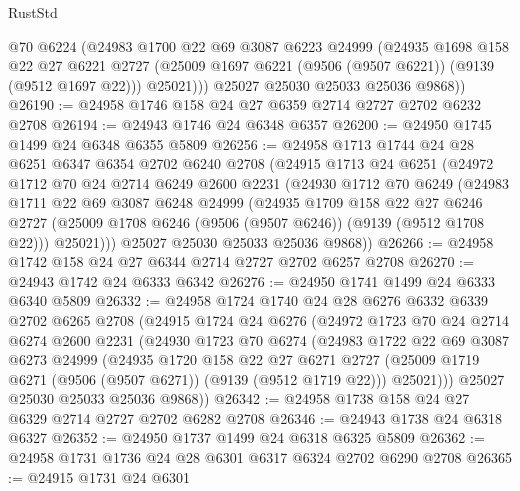 \begin{lexlean}{RustStd}
\begin{coremodule}
          @70
          @6224
          (@24983
            @1700
            @22
            @69
            @3087
            @6223
            @24999
            (@24935
              @1698
              @158
              @22
              @27
              @6221
              @2727
              (@25009 @1697 @6221 (@9506 (@9507 @6221)) (@9139 (@9512 @1697 @22)))
              @25021)))
        @25027
        @25030
        @25033
        @25036
        @9868))
@26190 := @24958 @1746 @158 @24 @27 @6359 @2714 @2727 @2702 @6232 @2708
@26194 := @24943 @1746 @24 @6348 @6357
@26200 := @24950 @1745 @1499 @24 @6348 @6355 @5809
@26256 := @24958
    @1713
    @1744
    @24
    @28
    @6251
    @6347
    @6354
    @2702
    @6240
    @2708
    (@24915
      @1713
      @24
      @6251
      (@24972
        @1712
        @70
        @24
        @2714
        @6249
        @2600
        @2231
        (@24930
          @1712
          @70
          @6249
          (@24983
            @1711
            @22
            @69
            @3087
            @6248
            @24999
            (@24935
              @1709
              @158
              @22
              @27
              @6246
              @2727
              (@25009 @1708 @6246 (@9506 (@9507 @6246)) (@9139 (@9512 @1708 @22)))
              @25021)))
        @25027
        @25030
        @25033
        @25036
        @9868))
@26266 := @24958 @1742 @158 @24 @27 @6344 @2714 @2727 @2702 @6257 @2708
@26270 := @24943 @1742 @24 @6333 @6342
@26276 := @24950 @1741 @1499 @24 @6333 @6340 @5809
@26332 := @24958
    @1724
    @1740
    @24
    @28
    @6276
    @6332
    @6339
    @2702
    @6265
    @2708
    (@24915
      @1724
      @24
      @6276
      (@24972
        @1723
        @70
        @24
        @2714
        @6274
        @2600
        @2231
        (@24930
          @1723
          @70
          @6274
          (@24983
            @1722
            @22
            @69
            @3087
            @6273
            @24999
            (@24935
              @1720
              @158
              @22
              @27
              @6271
              @2727
              (@25009 @1719 @6271 (@9506 (@9507 @6271)) (@9139 (@9512 @1719 @22)))
              @25021)))
        @25027
        @25030
        @25033
        @25036
        @9868))
@26342 := @24958 @1738 @158 @24 @27 @6329 @2714 @2727 @2702 @6282 @2708
@26346 := @24943 @1738 @24 @6318 @6327
@26352 := @24950 @1737 @1499 @24 @6318 @6325 @5809
@26362 := @24958 @1731 @1736 @24 @28 @6301 @6317 @6324 @2702 @6290 @2708
@26365 := @24915 @1731 @24 @6301

\end{coremodule}
\end{lexlean}
